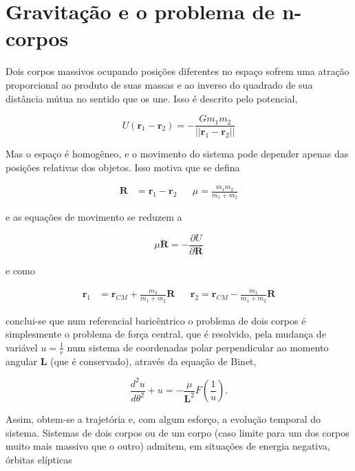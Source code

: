 \section{Gravitação e o problema de n-corpos}

Dois corpos massivos ocupando posições diferentes no espaço sofrem uma atração proporcional ao produto de suas massas e ao inverso do quadrado de sua distância mútua no sentido que os une. Isso é descrito pelo potencial,

\begin{equation}
    \label{eq:gravitacaouniversal}
    U(\mathbf{r}_1 - \mathbf{r}_2) = -\frac{Gm_1m_2}{||\mathbf{r}_1 - \mathbf{r}_2||}
\end{equation}

Mas o espaço é homogêneo, e o movimento do sistema pode depender apenas das posições relativas dos objetos. Isso motiva que se defina

\begin{align}
    \mathbf{R} &= \mathbf{r}_1 - \mathbf{r}_2 && \mu = \frac{m_1m_2}{m_1 + m_2}
\end{align}

e as equações de movimento se reduzem a

\begin{equation}
    \mu \ddot{\mathbf{R}} = -\frac{\partial U}{\partial \mathbf{R}}
\end{equation}

e como

\begin{align}
    \mathbf{r}_1 &= \mathbf{r}_{CM} + \frac{m_2}{m_1 + m_2}\mathbf{R} && \mathbf{r}_2 = \mathbf{r}_{CM} - \frac{m_1}{m_1 + m_2}\mathbf{R}
\end{align}

conclui-se que num referencial baricêntrico o problema de dois corpos é simplesmente o problema de força central, que é resolvido, pela mudança de variável $u = \frac{1}{r}$ num sistema de coordenadas polar perpendicular ao momento angular $\mathbf{L}$ (que é conservado), através da equação de Binet,

\begin{equation}
    \label{eq:binet}
    \frac{d^2u}{d\theta^2} + u = -\frac{\mu}{\mathbf{L}^2}F\left(\frac{1}{u}\right).
\end{equation}

Assim, obtem-se a trajetória e, com algum esforço, a evolução temporal do sistema. Sistemas de dois corpos ou de um corpo (caso limite para um dos corpos muito mais massivo que o outro) admitem, em situações de energia negativa, órbitas elípticas

